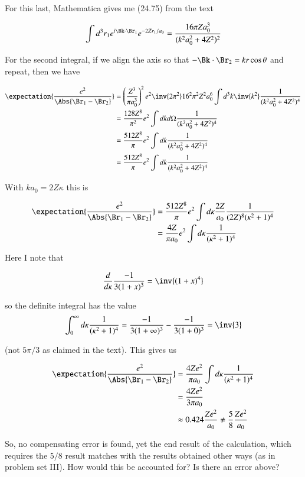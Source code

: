 For this last, Mathematica gives me (24.75) from the text

\begin{equation}\label{eqn:variationalHelium:10}
\int 
d^3 r_1 
e^{i \Bk \cdot \Br_1 } e^{ -2 Z r_1 /a_0} 
=
\frac{ 16 \pi Z a_0^3 }{(k^2 a_0^2 + 4 Z^2)^2}
\end{equation}

For the second integral, if we align the axis so that $-\Bk \cdot \Br_2 = k r \cos\theta$ and repeat, then we have

\begin{align*}
\expectation{\frac{e^2}{\Abs{\Br_1 - \Br_2}}}
&=
\left( \frac{Z^3}{\pi a_0^3}\right)^2 e^2
\inv{2 \pi^2} 
16^2 \pi^2 Z^2 a_0^6 
\int d^3 k \inv{k^2}
\frac{ 1 }{(k^2 a_0^2 + 4 Z^2)^4} \\
&=
\frac{128 Z^8}{\pi^2 } e^2
\int dk d\Omega 
\frac{ 1 }{(k^2 a_0^2 + 4 Z^2)^4} \\
&=
\frac{512 Z^8}{\pi} e^2
\int dk 
\frac{ 1 }{(k^2 a_0^2 + 4 Z^2)^4} \\
&=
\frac{512 Z^8}{\pi} e^2
\int dk 
\frac{ 1 }{(k^2 a_0^2 + 4 Z^2)^4} \\
\end{align*}

With $k a_0 = 2 Z \kappa$ this is

\begin{align*}
\expectation{\frac{e^2}{\Abs{\Br_1 - \Br_2}}}
&=
\frac{512 Z^8}{\pi} e^2
\int d\kappa 
\frac{ 2 Z }{a_0}
\frac{ 1 }{(2 Z)^8 (\kappa^2 + 1)^4} \\
&=
\frac{4 Z}{\pi a_0} e^2
\int d\kappa 
\frac{ 1 }{(\kappa^2 + 1)^4} \\
\end{align*}

Here I note that 

\begin{align*}
\frac{d}{d\kappa}
\frac{-1}{ 3 (1+x)^3 }
=
\inv{ (1+x)^4 }
\end{align*}

so the definite integral has the value
\begin{align*}
\int_0^\infty d\kappa 
\frac{ 1 }{ (\kappa^2 + 1)^4} 
=
\frac{-1}{ 3 (1+\infty)^3 }
-
\frac{-1}{ 3 (1+0)^3 }
= \inv{3}
\end{align*}

(not $5 \pi/3$ as claimed in the text).  This gives us

\begin{align*}
\expectation{\frac{e^2}{\Abs{\Br_1 - \Br_2}}}
&=
\frac{4 Z e^2} { \pi a_0 } 
\int d\kappa 
\frac{ 1 }{(\kappa^2 + 1)^4} \\
&=
\frac{4 Z e^2} { 3 \pi a_0 }  \\
&\approx 0.424 \frac{Z e^2 }{a_0} \ne \frac{5}{8} \frac{Z e^2 }{a_0}
\end{align*}

So, no compensating error is found, yet the end result of the calculation, which requires the $5/8$ result matches with the results obtained other ways (as in problem set III).  How would this be accounted for?  Is there an error above?

\EndArticle
